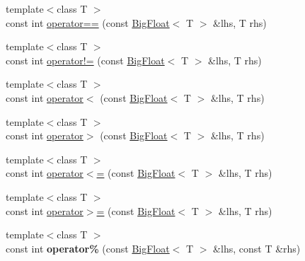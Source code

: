 \begin{DoxyCompactItemize}
\item 
{\footnotesize template$<$class T $>$ }\\const int \hyperlink{namespaceatl_a8b1db3183dd7b7f64f397c0f30424e4d}{operator==} (const \hyperlink{classatl_1_1_big_float}{Big\+Float}$<$ T $>$ \&lhs, T rhs)
\item 
{\footnotesize template$<$class T $>$ }\\const int \hyperlink{namespaceatl_a51558a6d0edfc8e2addcdc94e120cf5e}{operator!=} (const \hyperlink{classatl_1_1_big_float}{Big\+Float}$<$ T $>$ \&lhs, T rhs)
\item 
{\footnotesize template$<$class T $>$ }\\const int \hyperlink{namespaceatl_a6398b2686fe61b948cc72d4dd1a68811}{operator$<$} (const \hyperlink{classatl_1_1_big_float}{Big\+Float}$<$ T $>$ \&lhs, T rhs)
\item 
{\footnotesize template$<$class T $>$ }\\const int \hyperlink{namespaceatl_acdb517a04c26adcb7b09196cc9f54a34}{operator$>$} (const \hyperlink{classatl_1_1_big_float}{Big\+Float}$<$ T $>$ \&lhs, T rhs)
\item 
{\footnotesize template$<$class T $>$ }\\const int \hyperlink{namespaceatl_a642dd36ebe858e744bc5c554fc125458}{operator$<$=} (const \hyperlink{classatl_1_1_big_float}{Big\+Float}$<$ T $>$ \&lhs, T rhs)
\item 
{\footnotesize template$<$class T $>$ }\\const int \hyperlink{namespaceatl_a94b98205ca088109b032e3e04e603b67}{operator$>$=} (const \hyperlink{classatl_1_1_big_float}{Big\+Float}$<$ T $>$ \&lhs, T rhs)
\item 
\hypertarget{namespaceatl_a8b8ebd5ab10656362ccfdbd4e71e6b76}{{\footnotesize template$<$class T $>$ }\\const int {\bfseries operator\%} (const \hyperlink{classatl_1_1_big_float}{Big\+Float}$<$ T $>$ \&lhs, const T \&rhs)}\label{namespaceatl_a8b8ebd5ab10656362ccfdbd4e71e6b76}


\end{DoxyCompactItemize}
